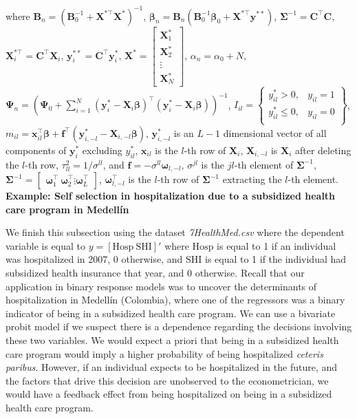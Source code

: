 where $\bm{B}_n=(\bm{B}_0^{-1}+\bm{X}^{*\top}\bm{X}^*)^{-1}$, $\bm{\beta}_n=\bm{B}_n(\bm{B}_0^{-1}\bm{\beta}_0+\bm{X}^{*\top}\bm{y}^{**})$, $\bm{\Sigma}^{-1}=\bm{C}^{\top}\bm{C}$, $\bm{X}_i^{*\top}=\bm{C}^{\top}\bm{X}_i$, $\bm{y}_i^{**}=\bm{C}^{\top}\bm{y}_i^*$, $\bm{X}^*=\begin{bmatrix}\bm{X}_1^*\\
	\bm{X}_2^*\\
	\vdots\\
	\bm{X}_N^*
\end{bmatrix}$, $\alpha_n=\alpha_0+N$, $\bm{\Psi}_n=(\bm{\Psi}_0+\sum_{i=1}^N (\bm{y}_i^*-\bm{X}_i\bm{\beta})^{\top}(\bm{y}_i^*-\bm{X}_i\bm{\beta}))^{-1}$, $I_{il}=\begin{Bmatrix} y_{il}^*> 0, & y_{il}=1\\
	y_{il}^*\leq 0 , & y_{il}=0\\
\end{Bmatrix}$, $m_{il}=\bm{x}_{il}^{\top}\bm{\beta}+\bm{f}^{\top}(\bm{y}_{i,-l}^*-\bm{X}_{i,-l}\bm{\beta})$, $\bm{y}_{i,-l}^*$ is an $L-1$ dimensional vector of all components of $\bm{y}_i^*$ excluding $y_{il}^*$, $\bm{x}_{il}$ is the $l$-th row of $\bm{X}_i$, $\bm{X}_{i,-l}$ is $\bm{X}_{i}$ after deleting the $l$-th row, $\tau_{ll}^2=1/\sigma^{ll}$, and $\bm{f}=-\sigma^{ll}\bm{\omega}_{l,-l}$, $\sigma^{jl}$ is the $jl$-th element of $\bm{\Sigma}^{-1}$, $\bm{\Sigma}^{-1}=\begin{bmatrix}\bm{\omega}_1^{\top} \ \bm{\omega}_2^{\top} \vdots \bm{\omega}_{L}^{\top} \end{bmatrix}$, $\bm{\omega}_{l,-l}^{\top}$ is the $l$-th row of $\bm{\Sigma}^{-1}$ extracting the $l$-th element.\\


\textbf{Example: Self selection in hospitalization due to a subsidized health care program in Medell\'in}

We finish this subsection using the dataset \textit{7HealthMed.csv} where the dependent variable is equal to $y = \left[\text{Hosp} \ \text{SHI}\right]'$ where $\text{Hosp}$ is equal to 1 if an individual was hospitalized in 2007, 0 otherwise, and $\text{SHI}$ is equal to 1 if the individual had subsidized health insurance that year, and 0 otherwise.
Recall that our application in binary response models was to uncover the determinants of hospitalization in Medell\'in (Colombia), where one of the regressors was a binary indicator of being in a subsidized health care program.
We can use a bivariate probit model if we suspect there is a dependence regarding the decisions involving these two variables.
We would expect a priori that being in a subsidized health care program would imply a higher probability of being hospitalized \textit{ceteris paribus}.
However, if an individual expects to be hospitalized in the future, and the factors that drive this decision are unobserved to the econometrician, we would have a feedback effect from being hospitalized on being in a subsidized health care program.

